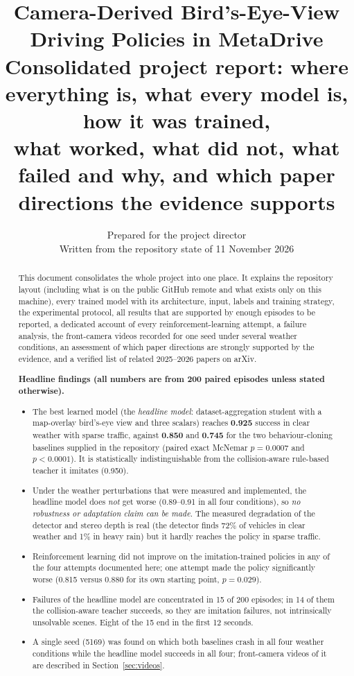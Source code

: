 \documentclass[11pt,a4paper]{article}
\title{\textbf{Camera-Derived Bird's-Eye-View Driving Policies in MetaDrive}\\[4pt]
\large Consolidated project report: where everything is, what every model is, how it was trained,\\
what worked, what did not, what failed and why, and which paper directions the evidence supports}
\author{Prepared for the project director\\ Written from the repository state of 11 November 2026}
\date{}
\begin{document}
\maketitle
\thispagestyle{empty}

\begin{abstract}
\noindent This document consolidates the whole project into one place. It explains the repository layout (including what is on the public
GitHub remote and what exists only on this machine), every trained model with its architecture, input, labels and training strategy,
the experimental protocol, all results that are supported by enough episodes to be reported, a dedicated account of every reinforcement-learning
attempt, a failure analysis, the front-camera videos recorded for one seed under several weather conditions, an assessment of which paper
directions are strongly supported by the evidence, and a verified list of related 2025--2026 papers on arXiv.

\medskip\noindent\textbf{Headline findings (all numbers are from 200 paired episodes unless stated otherwise).}
\begin{itemize}
\item The best learned model (the \emph{headline model}: dataset-aggregation student with a map-overlay bird's-eye view and three scalars) reaches
  \textbf{0.925} success in clear weather with sparse traffic, against \textbf{0.850} and \textbf{0.745} for the two behaviour-cloning baselines supplied in the
  repository (paired exact McNemar $p=0.0007$ and $p<0.0001$). It is statistically indistinguishable from the collision-aware rule-based teacher it imitates (0.950).
\item Under the weather perturbations that were measured and implemented, the headline model does \emph{not} get worse (0.89--0.91 in all four conditions), so
  \emph{no robustness or adaptation claim can be made}. The measured degradation of the detector and stereo depth is real (the detector finds 72\% of vehicles in clear weather and 1\% in heavy rain) but
  it hardly reaches the policy in sparse traffic.
\item Reinforcement learning did not improve on the imitation-trained policies in any of the four attempts documented here; one attempt made the policy significantly worse (0.815 versus 0.880 for its own starting point, $p=0.029$).
\item Failures of the headline model are concentrated in 15 of 200 episodes; in 14 of them the collision-aware teacher succeeds, so they are imitation failures, not intrinsically unsolvable scenes. Eight of the 15 end in the first 12 seconds.
\item A single seed (5169) was found on which both baselines crash in all four weather conditions while the headline model succeeds in all four; front-camera videos of it are described in Section~\ref{sec:videos}.
\end{itemize}
\end{abstract}
\end{document}

